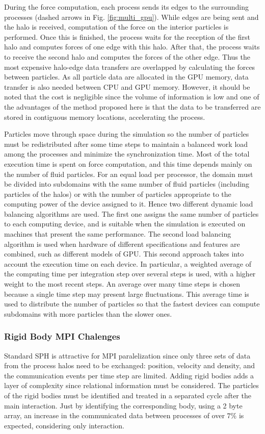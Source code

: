 %
During the force computation, each process sends its edges to the surrounding processes (dashed arrows in Fig. \ref{fig:multi_gpu}). While edges are being sent and the halo is received, computation of the force on the interior particles is performed. Once this is finished, the process waits for the reception of the first halo and computes forces of one edge with this halo. After that, the process waits to receive the second halo and computes the forces of the other edge. Thus the most expensive halo-edge data transfers are overlapped by calculating the forces between particles. As all particle data are allocated in the \ac{GPU} memory, data transfer is also needed between \ac{CPU} and \ac{GPU} memory. However, it should be noted that the cost is negligible since the volume of information is low and one of the advantages of the method proposed here is that the data to be transferred are stored in contiguous memory locations, accelerating the process.

Particles move through space during the simulation so the number of particles must be redistributed after some time steps to maintain a balanced work load among the processes and minimize the synchronization time. Most of the total execution time is spent on force computation, and this time depends mainly on the number of fluid particles. For an equal load per processor, the domain must be divided into subdomains with the same number of fluid particles (including particles of the halos) or with the number of particles appropriate to the computing power of the device assigned to it. Hence two different dynamic load balancing algorithms are used. The first one assigns the same number of particles to each computing device, and is suitable when the simulation is executed on machines that present the same performance. The second load balancing algorithm is used when hardware of different specifications and features are combined, such as different models of \ac{GPU}. This second approach takes into account the execution time on each device. In particular, a weighted average of the computing time per integration step over several steps is used, with a higher weight to the most recent steps. An average over many time steps is chosen because a single time step may present large fluctuations. This average time is used to distribute the number of particles so that the fastest devices can compute subdomains with more particles than the slower ones.

\subsubsection{Rigid Body \ac{MPI} Chalenges}
%
Standard \ac{SPH} is attractive for \ac{MPI} paralelization since only three sets of data from the process halos need to be exchanged: position, velocity and density, and the communication events per time step are limited. Adding rigid bodies adds a layer of complexity since relational information must be considered. The particles of the rigid bodies must be identified and treated in a separated cycle after the main interaction. Just by identifying the corresponding body, using a 2 byte array, an increase in the communicated data between processes of over $7\%$ is expected, considering only interaction.

